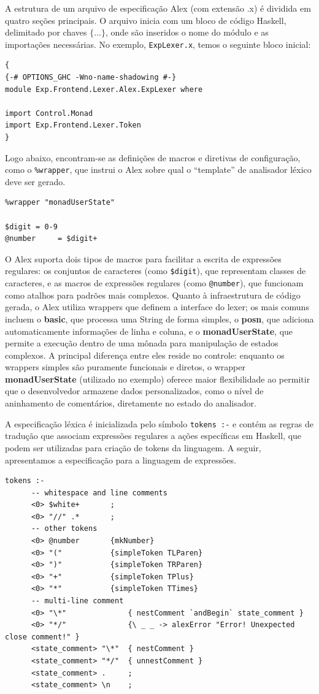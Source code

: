 A estrutura de um arquivo de especificação Alex (com extensão .x) é
dividida em quatro seções principais. O arquivo inicia com um bloco
de código Haskell, delimitado por chaves $\{ \ldots{} \}$, onde são
inseridos o nome do módulo e as importações necessárias. No exemplo,
\verb|ExpLexer.x|, temos o seguinte bloco inicial:

\begin{verbatim}
{
{-# OPTIONS_GHC -Wno-name-shadowing #-}
module Exp.Frontend.Lexer.Alex.ExpLexer where

import Control.Monad
import Exp.Frontend.Lexer.Token
}
\end{verbatim}

Logo abaixo, encontram-se as definições de macros e diretivas de
configuração, como o \verb|%wrapper|, que instrui o Alex sobre qual o
``template'' de analisador léxico deve ser gerado.

\begin{verbatim}
%wrapper "monadUserState"

$digit = 0-9
@number     = $digit+
\end{verbatim}

O Alex suporta dois tipos de macros para facilitar a escrita de
expressões regulares: os conjuntos de caracteres (como
\verb|$digit|), que representam classes de
caracteres, e as macros de expressões regulares (como
\verb|@number|), que funcionam como atalhos para
padrões mais complexos. Quanto à infraestrutura de código gerada, o
Alex utiliza wrappers que definem a interface do lexer; os mais
comuns incluem o \textbf{basic}, que processa uma String de forma
simples, o \textbf{posn}, que adiciona automaticamente informações de
linha e coluna, e o \textbf{monadUserState}, que permite a execução
dentro de uma mônada para manipulação de estados complexos. A
principal diferença entre eles reside no controle: enquanto os
wrappers simples são puramente funcionais e diretos, o wrapper
\textbf{monadUserState} (utilizado no exemplo) oferece maior
flexibilidade ao permitir que o desenvolvedor armazene dados
personalizados, como o nível de aninhamento de comentários,
diretamente no estado do analisador.

A especificação léxica é inicializada pelo símbolo
\verb|tokens :-| e contém as regras de tradução
que associam expressões regulares a ações específicas em Haskell, que
podem ser utilizadas para criação de tokens da linguagem. A seguir,
apresentamos a especificação para a linguagem de expressões.

\begin{verbatim}
tokens :-
      -- whitespace and line comments
      <0> $white+       ;
      <0> "//" .*       ;
      -- other tokens
      <0> @number       {mkNumber}
      <0> "("           {simpleToken TLParen}
      <0> ")"           {simpleToken TRParen}
      <0> "+"           {simpleToken TPlus}
      <0> "*"           {simpleToken TTimes}
      -- multi-line comment
      <0> "\*"              { nestComment `andBegin` state_comment }
      <0> "*/"              {\ _ _ -> alexError "Error! Unexpected close comment!" }
      <state_comment> "\*"  { nestComment }
      <state_comment> "*/"  { unnestComment }
      <state_comment> .     ;
      <state_comment> \n    ;
\end{verbatim}

